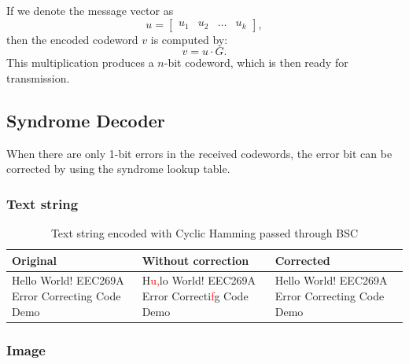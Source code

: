 \documentclass{article}
\begin{document}
If we denote the message vector as 
\begin{equation*}
    u =
        \begin{bmatrix}
        u_1 & u_2 & \dots & u_k 
        \end{bmatrix},
\end{equation*}
then the encoded codeword $v$ is computed by:
\begin{equation*}
    v = u \cdot G .
\end{equation*}
This multiplication produces a $n$-bit codeword, which is then ready for transmission.


\subsection{Syndrome Decoder}
When there are only 1-bit errors in the received codewords, the error bit can be corrected by using the syndrome lookup table.

\subsubsection{Text string}

\begin{table}[htb]
    \centering
    \caption{Text string encoded with Cyclic Hamming passed through BSC}
    \label{tab:text-cyclic-bsc}
    \renewcommand{\arraystretch}{1.5}
    \begin{tabulary}{\textwidth}{ |L|L|L| } 
    \hline
    \textbf{Original} & \textbf{Without correction} & \textbf{Corrected} \\
    \hline
    Hello World! EEC269A Error Correcting Code Demo & H\textcolor{red}{u,}lo World! EEC269A Error Correcti\textcolor{red}{f}g Code Demo & Hello World! EEC269A Error Correcting Code Demo \\
    \hline
    \end{tabulary}
\end{table}



\subsubsection{Image}
\end{document}
